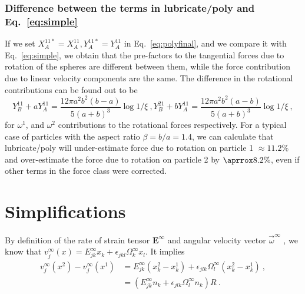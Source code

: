 \documentclass[reprint, amsmath,amssymb,aps,pre,onecolumn,notitlepage%
]{revtex4-1}
\begin{document}
\subsubsection{Difference between the terms in lubricate/poly and Eq.~\ref{eq:simple}}
If we set $X_A^{11*}=X_A^{11},Y_A^{11*}=Y_A^{11}$ in Eq.~\eqref{eq:polyfinal}, and we compare it with Eq.~\eqref{eq:simple}, we obtain that the pre-factors to the tangential forces due to rotation of the spheres are different between them, while the force contribution due to linear velocity components are the same. The difference in the rotational contributions can be found out to be
\begin{equation}
	Y_B^{11}+a Y_A^{11}=\frac{12 \pi a^2 b^2 (b - a) }{5 (a+b)^3}\log{1/\xi}\ ,
	Y_B^{21}+b Y_A^{11}=\frac{12 \pi a^2 b^2 (a - b) }{5 (a+b)^3}\log{1/\xi}\ ,
\end{equation}
for $\omega^1$, and $\omega^2$ contributions to the rotational forces respectively. For a typical case of particles with the aspect ratio $\beta=b/a=1.4$, we can calculate that lubricate/poly will under-estimate force due to rotation on particle 1 $\approx 11.2\%$ and over-estimate the force due to rotation on particle 2 by $\aprrox 8.2 \%$, even if other terms in the force class were corrected.

\newpage

\section{Simplifications}
\label{sec:simple}
By definition of the rate of strain tensor $\bm{E}^{\infty}$ and angular velocity vector $\vec{\omega}^{\infty}$ , we know that $v_j^\infty(x)=E^\infty_{jk}x_k+\epsilon_{jkl}\Omega^\infty_kx_l$. It implies
\begin{equation}
	\begin{split}
v_j^\infty(x^2)-v_j^\infty(x^1)&=E^\infty_{jk}(x_k^2-x_k^1)+\epsilon_{jlk}\Omega^\infty_l(x_k^2-x_k^1)\ ,\\
&=\left(E^\infty_{jk}n_k +\epsilon_{jlk}\Omega^\infty_l n_k\right)R \ . \\
\end{split}
\label{eq:vinf}
\end{equation}
\end{document}

